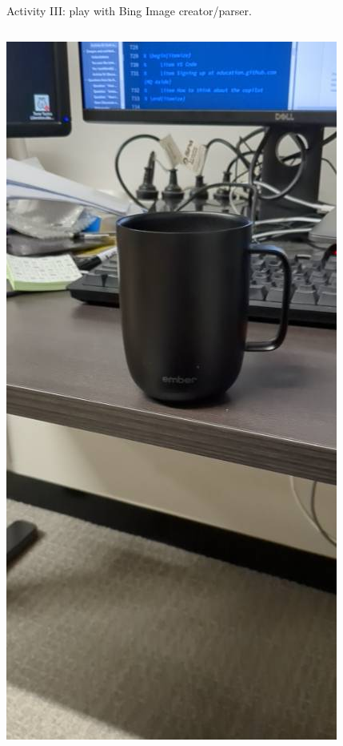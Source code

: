\documentclass[aspectratio=169]{beamer}
\begin{document}
\begin{frame}{Activity III: play with Bing Image creator/parser.}
\begin{columns}
\begin{column}{.25\textwidth}
    \includegraphics[width=\textwidth]{Figures/blob.jpeg}
    \end{column}
    \begin{column}{.25\textwidth}

\end{column}
\end{columns}
\end{frame}
\end{document}
